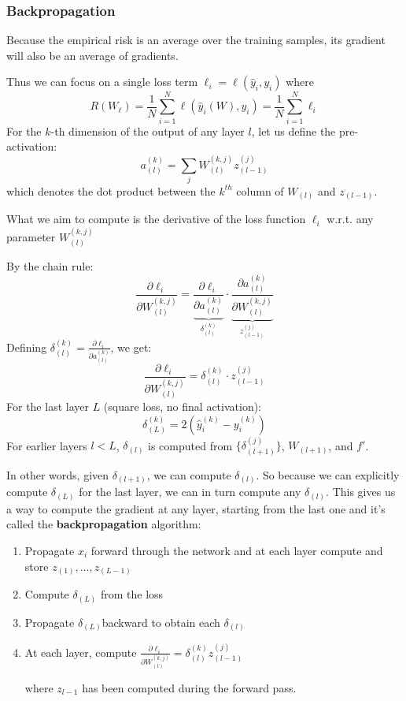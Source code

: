 \subsubsection{Backpropagation}
Because the empirical risk is an average over the training
samples, its gradient will also be an average of gradients. 

Thus we can focus on a single loss term $\ell_i = \ell(\hat{y}_i, y_i)$ where \[
  R(W_{\ell}) = \frac{1}{N} \sum_{i=1}^{N} \ell(\hat{y}_i(W), y_i) = \frac{1}{N}\sum_{i=1}^{N} \ell_i
\]
For the $k$-th dimension of the output of any layer $l$, let us define the pre-activation:
\[
  a_{(l)}^{(k)} = \sum_j W_{(l)}^{(k,j)} z_{(l-1)}^{(j)}
\] which denotes the dot product between the $k^{th}$ column of $W_{(l)}$ and $z_{(l-1)}$.

What we aim to compute is the derivative of the loss function $\ell_i$ w.r.t. any parameter $W_{(l)}^{(k,j)}$

By the chain rule:
\[
  \frac{\partial \ell_i}{\partial W_{(l)}^{(k,j)}} = 
  \underbrace{\frac{\partial \ell_i}{\partial a_{(l)}^{(k)}}}_{\delta_{(l)}^{(k)}} 
  \cdot \underbrace{\frac{\partial a_{(l)}^{(k)}}{\partial W_{(l)}^{(k,j)}}}_{z_{(l-1)}^{(j)}}
\]
Defining $\delta_{(l)}^{(k)} = \frac{\partial \ell_i}{\partial a_{(l)}^{(k)}}$, we get:
\[
  \frac{\partial \ell_i}{\partial W_{(l)}^{(k,j)}} = \delta_{(l)}^{(k)} \cdot z_{(l-1)}^{(j)}
\]
For the last layer $L$ (square loss, no final activation):
\[
  \delta_{(L)}^{(k)} = 2(\hat{y}_i^{(k)} - y_i^{(k)})
\]
For earlier layers $l < L$, $\delta_{(l)}$ is computed from $\{\delta_{(l+1)}^{(j)}\}$, 
$W_{(l+1)}$, and $f'$. 

In other words, given $\delta_{(l + 1)}$, we can compute $\delta_{(l)}$. So because we can explicitly compute $\delta_{(L)}$ for the last layer, we can in turn compute any $\delta_{(l)}$.
\newpage
This gives us a way to compute the gradient at any layer, starting from the last one and it's called the \textbf{backpropagation} algorithm:
\begin{enumerate}
  \item Propagate $x_i$ forward through the network and at each layer compute and store $z_{(1)}, \dots, z_{(L-1)}$
  \item Compute $\delta_{(L)}$ from the loss
  \item Propagate $\delta_{(L)} $backward to obtain each $\delta_{(l)}$
  \item At each layer, compute $\frac{\partial \ell_i}{\partial W_{(l)}^{(k,j)}} = \delta_{(l)}^{(k)} z_{(l-1)}^{(j)}$

    where $z_{l-1}$ has been computed during the forward pass.
\end{enumerate}

